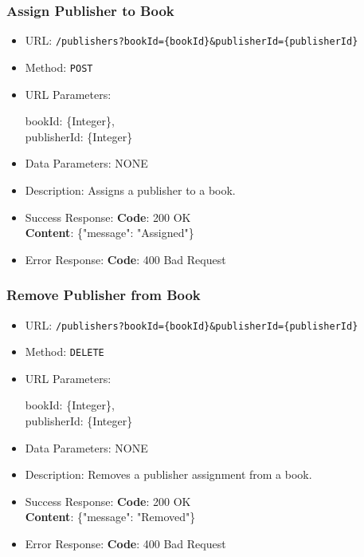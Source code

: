 \subsubsection*{Assign Publisher to Book}

\begin{itemize}
    \item URL: \texttt{/publishers?bookId=\{bookId\}\&publisherId=\{publisherId\}}
    \item Method: \texttt{POST}
    \item URL Parameters:

    bookId: \{Integer\}, \\
    publisherId: \{Integer\}

    \item Data Parameters: NONE
    \item Description: Assigns a publisher to a book.

    \item Success Response: \newline
    \textbf{Code}: 200 OK \\
    \textbf{Content}: \{"message": "Assigned"\}

    \item Error Response: \newline
    \textbf{Code}: 400 Bad Request
\end{itemize}

\subsubsection*{Remove Publisher from Book}

\begin{itemize}
    \item URL: \texttt{/publishers?bookId=\{bookId\}\&publisherId=\{publisherId\}}
    \item Method: \texttt{DELETE}
    \item URL Parameters:

    bookId: \{Integer\}, \\
    publisherId: \{Integer\}

    \item Data Parameters: NONE
    \item Description: Removes a publisher assignment from a book.

    \item Success Response: \newline
    \textbf{Code}: 200 OK \\
    \textbf{Content}: \{"message": "Removed"\}

    \item Error Response: \newline
    \textbf{Code}: 400 Bad Request
\end{itemize}

